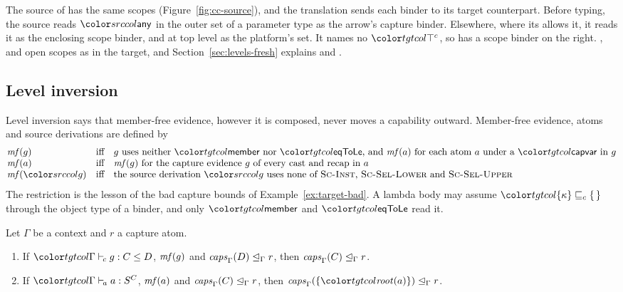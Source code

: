 The source of \treeCC has the same scopes (Figure~\ref{fig:cc-source}), and the translation sends each binder to its target counterpart. Before typing, the source reads $\cany$ in the outer set of a parameter type as the arrow's capture binder. Elsewhere, where its  allows it, it reads it as the enclosing scope binder, and at top level as the platform's set. It names no $\topc$, so  has a scope binder on the right. ,  and  open scopes as in the target, and Section~\ref{sec:levels-fresh} explains  and .

\subsection{Level inversion}\label{sec:levels-inversion}

Level inversion says that member-free evidence, however it is composed, never moves a capability outward. Member-free evidence, atoms and source derivations are defined by
\[
\begin{array}{@{}lcl@{}}
\mfree{g} & \text{iff} & g \text{ uses neither } \ev{member} \text{ nor } \ev{eqToLe}\text{, and } \mfree{a} \text{ for each atom } a \text{ under a } \ev{capvar} \text{ in } g \\
\mfree{a} & \text{iff} & \mfree{g} \text{ for the capture evidence } g \text{ of every cast and recap in } a \\
\mfree{\src{g}} & \text{iff} & \text{the source derivation } \src{g} \text{ uses none of } \rn{Sc-Inst}\text{, } \rn{Sc-Sel-Lower} \text{ and } \rn{Sc-Sel-Upper}
\end{array}
\]
The restriction is the lesson of the bad capture bounds of Example~\ref{ex:target-bad}. A lambda body may assume $\plec{\cset{\kappa}}{\cempty}$ through the object type of a binder, and only $\ev{member}$ and $\ev{eqToLe}$ read it.

\begin{theorem}\label{thm:lvl-inv}
Let $\Gamma$ be a context and $r$ a capture atom.
\begin{enumerate}
\item If $\clej{\Gamma}{g}{C}{D}$, $\mathit{mf}(g)$ and $\mathit{caps}^{}_{\Gamma}(D) \trianglelefteq_{\Gamma} r$, then $\mathit{caps}^{}_{\Gamma}(C) \trianglelefteq_{\Gamma} r$.
\item If $\atomj{\Gamma}{a}{\capt{S}{C}}$, $\mathit{mf}(a)$ and $\mathit{caps}^{}_{\Gamma}(C) \trianglelefteq_{\Gamma} r$, then $\lvlle{\Gamma}{\capsr{\Gamma}{}{\cset{\rt{a}}}}{r}$.
\end{enumerate}
\end{theorem}

